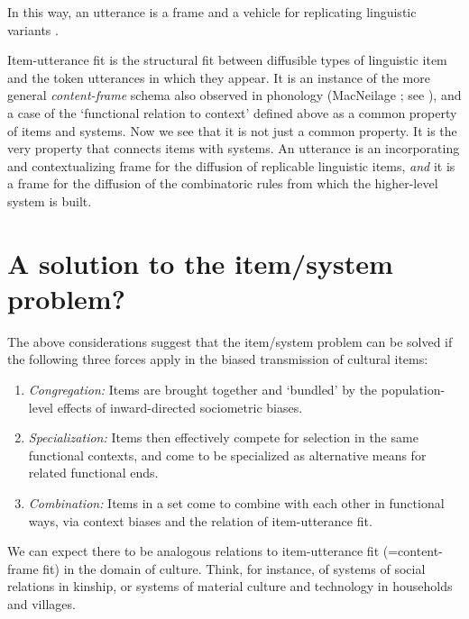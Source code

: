 In this way, an utterance is a frame and a vehicle for replicating linguistic variants \citep{croft_explaining_2000}. 



Item-utterance fit is the structural fit between diffusible types of 
linguistic item and the token utterances in which they appear. It is an 
instance of the more general \textit{content-frame} schema \citep{levelt_speaking:_1989} also 
observed in phonology (MacNeilage \citeyear{macneilage_frame/content_1998}; see \citealt[54-55]{enfield_relationship_2013}), and a 
case of the \textquoteleft functional relation to context' defined above as a common property of items and systems. Now we see that it is not just a 
common property. It is the very property that connects items with systems. An utterance is an incorporating and contextualizing 
frame for the diffusion of replicable linguistic items, \textit{and} it is a frame for the diffusion of the combinatoric rules from which the 
higher-level system is built. 



\section{A solution to the item/system problem?}


The above considerations suggest that the item/system problem can be 
solved if the following three forces apply in the 
biased transmission of cultural items: 

\begin{enumerate}

\item {\textit{Congregation:} Items are brought together and `bundled' by the population-level effects of inward-directed sociometric biases.}

\item {\textit{Specialization:} Items then effectively compete for selection in the same functional contexts, and come to be specialized as alternative means for related functional ends.}
 \item {\textit{Combination:} Items in a set come to combine with each other in functional ways, via context biases and the relation of item-utterance fit.} 

\end{enumerate}

We can expect there to be analogous relations to 
item-utterance fit  (=content-frame fit) in the domain of culture. Think, for instance, of 
systems of social relations in kinship, or systems of material culture 
and technology in households and villages. 



